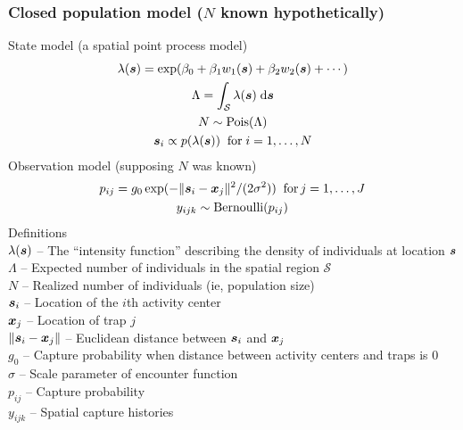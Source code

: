 \documentclass[color=usenames,dvipsnames]{beamer}\usepackage[]{graphicx}\usepackage[]{color}
\begin{document}





\begin{frame}
  \frametitle{\large Closed population model ($N$ known hypothetically) }
  \footnotesize
  State model (a spatial point process model) %
  \begin{gather*}
    \lambda({\bm s}) = \exp(\beta_0 + \beta_1 w_1({\bm s}) + \beta_2 w_2({\bm s}) + \cdots) \\
    \Lambda = \int_{\mathcal{S}} \lambda({\bm s}) \; \mathrm{d}{\bm s} \\
    N \sim \mathrm{Pois}(\Lambda) \\
    {\bm s}_i \propto p(\lambda({\bm s})) \;\; \mathrm{for}\; i=1,\dots,N 
  \end{gather*}
  \pause
  Observation model (supposing $N$ was known)
  \begin{gather*}
    p_{ij} = g_0\exp(-\|{\bm s}_i - {\bm x}_j\|^2/(2\sigma^2))  \;\; \mathrm{for}\, j=1,\dots,J  \\
    y_{ijk} \sim \mathrm{Bernoulli}(p_{ij})
  \end{gather*}
  \pause
  \scriptsize
  Definitions \\
  \hangindent=0.9cm $\lambda({\bm s})$ -- The ``intensity function'' %
  describing the density of individuals at location ${\bm s}$ \\ 
  $\Lambda$ -- Expected number of individuals in the spatial region $\mathcal{S}$ \\
  $N$ -- Realized number of individuals (ie, population size) \\
  ${\bm s}_i$ -- Location of the $i$th activity center \\
  ${\bm x}_j$ -- Location of trap $j$ \\
  $\|{\bm s}_i - {\bm x}_j\|$ -- Euclidean distance between ${\bm s}_i$ and ${\bm x}_j$ \\
  $g_0$ -- Capture probability when distance between activity centers
  and traps is 0 \\
  $\sigma$ -- Scale parameter of encounter function \\
  $p_{ij}$ -- Capture probability \\
  $y_{ijk}$ -- Spatial capture histories \\
\end{frame}
\end{document}

